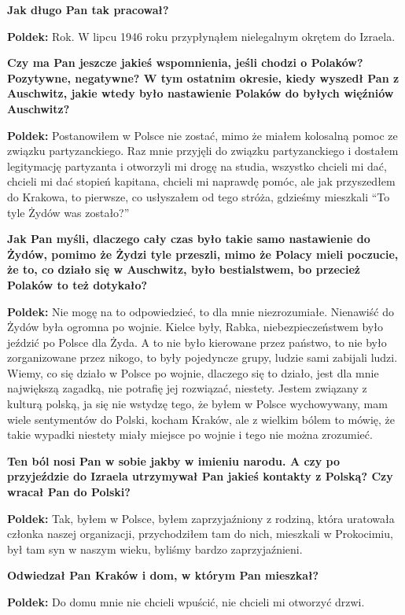 \begin{otherlanguage}{polish}
\textbf{Jak długo Pan tak pracował?}

\textbf{Poldek:} Rok. W lipcu 1946 roku przypłynąłem nielegalnym okrętem do Izraela.
  
\textbf{Czy ma Pan jeszcze jakieś wspomnienia, jeśli chodzi o Polaków? Pozytywne, negatywne? W tym ostatnim okresie, kiedy wyszedł Pan z Auschwitz, jakie wtedy było nastawienie Polaków do byłych więźniów Auschwitz?}

\textbf{Poldek:} Postanowiłem w Polsce nie zostać, mimo że miałem kolosalną pomoc ze związku partyzanckiego. Raz mnie przyjęli do związku partyzanckiego i dostałem legitymację partyzanta i otworzyli mi drogę na studia, wszystko chcieli mi dać, chcieli mi dać stopień kapitana, chcieli mi naprawdę pomóc, ale jak przyszedłem do Krakowa, to pierwsze, co usłyszałem od tego stróża, gdzieśmy mieszkali "`To tyle Żydów was zostało?"' 

\textbf{Jak Pan myśli, dlaczego cały czas było takie samo nastawienie do Żydów, pomimo że Żydzi tyle przeszli, mimo że Polacy mieli poczucie, że to, co działo się w Auschwitz, było bestialstwem, bo przecież Polaków to też dotykało?}
  
\textbf{Poldek:} Nie mogę na to odpowiedzieć, to dla mnie niezrozumiałe. Nienawiść do Żydów była ogromna po wojnie. Kielce były, Rabka, niebezpieczeństwem było jeździć po Polsce dla Żyda. A to nie było kierowane przez państwo, to nie było zorganizowane przez nikogo, to były pojedyncze grupy, ludzie sami zabijali ludzi. Wiemy, co się działo w Polsce po wojnie, dlaczego się to działo, jest dla mnie największą zagadką, nie potrafię jej rozwiązać, niestety. Jestem związany z kulturą polską, ja się nie wstydzę tego, że byłem w Polsce wychowywany, mam wiele sentymentów do Polski, kocham Kraków, ale z wielkim bólem to mówię, że takie wypadki niestety miały miejsce po wojnie i tego nie można zrozumieć. 

\textbf{Ten ból nosi Pan w sobie jakby w imieniu narodu. A czy po przyjeździe do Izraela utrzymywał Pan jakieś kontakty z Polską? Czy wracał Pan do Polski?}

\textbf{Poldek:} Tak, byłem w Polsce, byłem zaprzyjaźniony z rodziną, która uratowała członka naszej organizacji, przychodziłem tam do nich, mieszkali w Prokocimiu, był tam syn w naszym wieku, byliśmy bardzo zaprzyjaźnieni. 

\textbf{Odwiedzał Pan Kraków i dom, w którym Pan mieszkał?}

\textbf{Poldek:} Do domu mnie nie chcieli wpuścić, nie chcieli mi otworzyć drzwi.


\end{otherlanguage}
